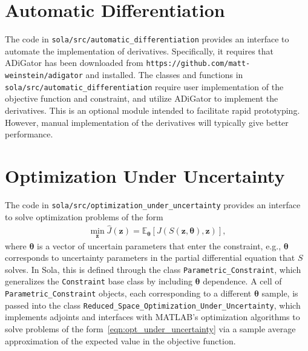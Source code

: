 \documentclass[11pt]{article}
\renewcommand{\t}{\bm{\theta}}
\newcommand{\z}{\bm{z}}
\newcommand{\0}{\bm{0}}
\newcommand{\Jhat}{\hat{J}}
\begin{document}
\section*{Automatic Differentiation}
The code in \texttt{sola/src/automatic\_differentiation} provides an interface to automate the implementation of derivatives. Specifically, it requires that ADiGator has been downloaded from \texttt{https://github.com/matt-weinstein/adigator} and installed. The classes and functions in \texttt{sola/src/automatic\_differentiation} require user implementation of the objective function and constraint, and utilize ADiGator to implement the derivatives. This is an optional module intended to facilitate rapid prototyping. However, manual implementation of the derivatives will typically give better performance.

\section*{Optimization Under Uncertainty}
The code in \texttt{sola/src/optimization\_under\_uncertainty} provides an interface to solve optimization problems of the form
\begin{align} \label{eqn:opt_under_uncertainty}
\min_{\z} \Jhat(\z) = \mathbb{E}_{\t} \left[ J(S(\z,\t),\z) \right],
\end{align}
where $\t$ is a vector of uncertain parameters that enter the constraint, e.g., $\t$ corresponds to uncertainty parameters in the partial differential equation that $S$ solves. In Sola, this is defined through the class \texttt{Parametric\_Constraint}, which generalizes the \texttt{Constraint} base class by including $\t$ dependence. A cell of \texttt{Parametric\_Constraint} objects, each corresponding to a different $\t$ sample, is passed into the class \texttt{Reduced\_Space\_Optimization\_Under\_Uncertainty}, which implements adjoints and interfaces with MATLAB's optimization algorithms to solve problems of the form~\eqref{eqn:opt_under_uncertainty} via a sample average approximation of the expected value in the objective function.
\end{document}
